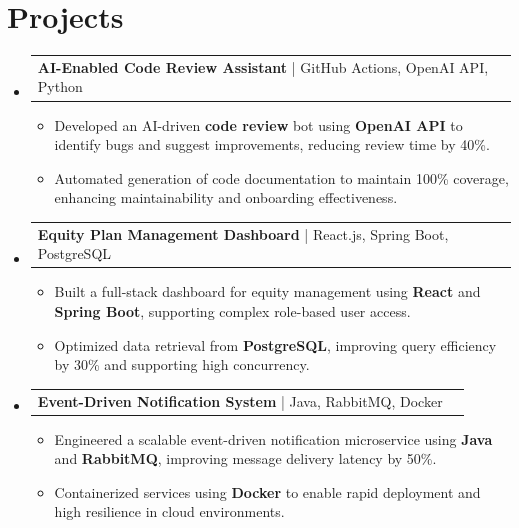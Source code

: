 \documentclass[letterpaper,11pt]{article}
\makeatletter
\newcommand{\resumeItem}[1]{
  \item\footnotesize{
    {#1 \vspace{-2pt}}
  }
}
\newcommand{\resumeProjectHeading}[2]{
    \item
    \begin{tabular*}{1.001\textwidth}{l@{\extracolsep{\fill}}r}
      \small#1 & \textbf{\small #2}\\
    \end{tabular*}\vspace{-7pt}
}
\newcommand{\resumeSubHeadingListStart}{\begin{itemize}[leftmargin=0pt, label={}]}
\newcommand{\resumeSubHeadingListEnd}{\end{itemize}}
\newcommand{\resumeItemListStart}{\begin{itemize}[leftmargin=*]}
\newcommand{\resumeItemListEnd}{\end{itemize}\vspace{-5pt}}
\makeatother
\begin{document}
\section{Projects}
    \vspace{-5pt}
    \resumeSubHeadingListStart
      \resumeProjectHeading
          {\textbf{AI-Enabled Code Review Assistant} | GitHub Actions, OpenAI API, Python}{}
          \resumeItemListStart
              \resumeItem{Developed an AI-driven \textbf{code review} bot using \textbf{OpenAI API} to identify bugs and suggest improvements, reducing review time by 40\%.}
              \resumeItem{Automated generation of code documentation to maintain 100\% coverage, enhancing maintainability and onboarding effectiveness.}
          \resumeItemListEnd
          \vspace{-12pt}
      \resumeProjectHeading
          {\textbf{Equity Plan Management Dashboard} | React.js, Spring Boot, PostgreSQL}{}
          \resumeItemListStart
              \resumeItem{Built a full-stack dashboard for equity management using \textbf{React} and \textbf{Spring Boot}, supporting complex role-based user access.}
              \resumeItem{Optimized data retrieval from \textbf{PostgreSQL}, improving query efficiency by 30\% and supporting high concurrency.}
          \resumeItemListEnd
          \vspace{-12pt}
      \resumeProjectHeading
          {\textbf{Event-Driven Notification System} | Java, RabbitMQ, Docker}{}
          \resumeItemListStart
              \resumeItem{Engineered a scalable event-driven notification microservice using \textbf{Java} and \textbf{RabbitMQ}, improving message delivery latency by 50\%.}
              \resumeItem{Containerized services using \textbf{Docker} to enable rapid deployment and high resilience in cloud environments.}
          \resumeItemListEnd 
    \resumeSubHeadingListEnd
\end{document}
